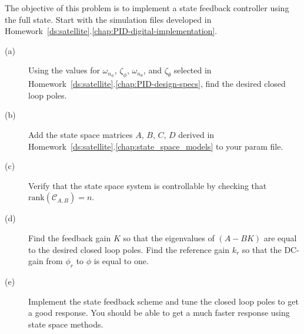 
The objective of this problem is to implement a state feedback controller using the full state.
Start with the simulation files developed in Homework~\ref{ds:satellite}.\ref{chap:PID-digital-implementation}.
\begin{description}
\item[(a)] Using the values for $\omega_{n_\phi}$, $\zeta_\phi$, $\omega_{n_{\theta}}$, and $\zeta_{\theta}$ selected in Homework~\ref{ds:satellite}.\ref{chap:PID-design-specs}, find the desired closed loop poles.  
\item[(b)] Add the state space matrices $A$, $B$, $C$, $D$ derived in Homework~\ref{ds:satellite}.\ref{chap:state_space_models} to your param file.
\item[(c)] Verify that the state space system is controllable by checking that $\text{rank}(\mathcal{C}_{A,B})=n$.
\item[(d)] Find the feedback gain $K$ so that the eigenvalues of $(A-BK)$ are equal to the desired closed loop poles.  Find the reference gain $k_r$ so that the DC-gain from $\phi_r$ to $\phi$ is equal to one.  
\item[(e)] Implement the state feedback scheme and tune the closed loop poles to get a good response.  You should be able to get a much faster response using state space methods.
\end{description}